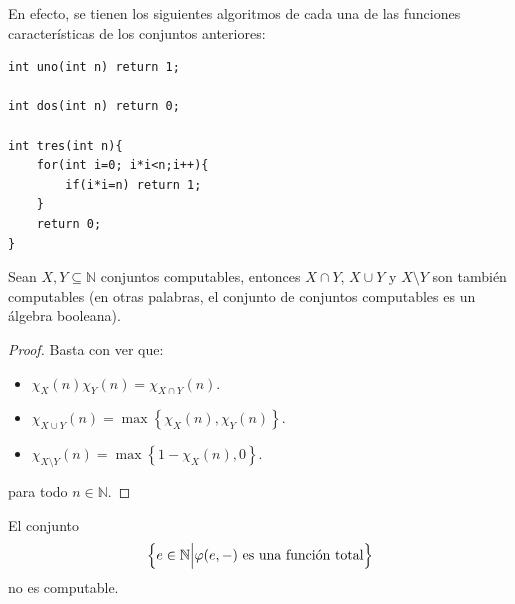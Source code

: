 \documentclass[12pt]{report}
\newcounter{it}
\theoremstyle{largebreak}
\begin{document}
    \begin{sol}
        En efecto, se tienen los siguientes algoritmos de cada una de las funciones características de los conjuntos anteriores:
        \begin{lstlisting}
int uno(int n) return 1;

int dos(int n) return 0;

int tres(int n){
    for(int i=0; i*i<n;i++){
        if(i*i=n) return 1;
    }
    return 0;
}
        \end{lstlisting}
    \end{sol}

    \begin{propo}
        Sean $X,Y\subseteq\mathbb{N}$ conjuntos computables, entonces $X\cap Y$, $X\cup Y$ y $X\setminus Y$ son también computables (en otras palabras, el conjunto de conjuntos computables es un álgebra booleana).
    \end{propo}

    \begin{proof}
        Basta con ver que:
        \begin{itemize}
            \item $\chi_X(n)\chi_Y(n)=\chi_{ X\cap Y}(n)$.
            \item $\chi_{ X\cup Y}(n)=\max\left\{\chi_X(n),\chi_Y(n) \right\}$.
            \item $\chi_{ X\setminus Y}(n)=\max\left\{1-\chi_X(n),0 \right\}$.
        \end{itemize}
        para todo $n\in\mathbb{N}$.
    \end{proof}

    \begin{theor}
        El conjunto
        \begin{equation*}
            \left\{e\in\mathbb{N}\Big|\varphi(e,-)\textup{ es una función total} \right\}
        \end{equation*}
        no es computable.
    \end{theor}
\end{document}
